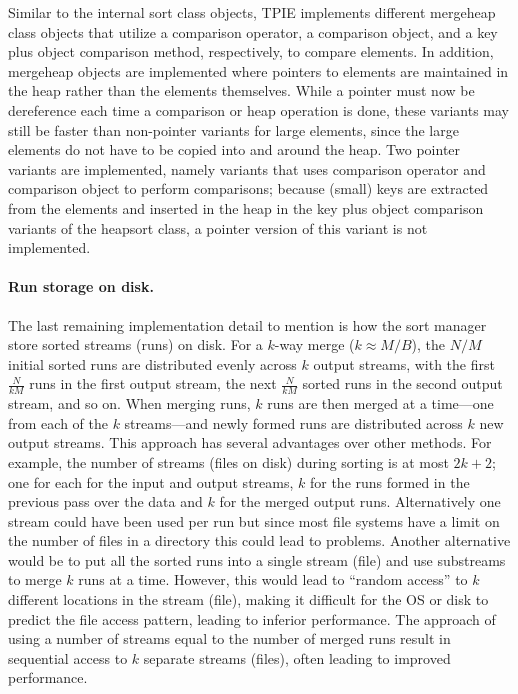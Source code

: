 Similar to the internal sort class objects, TPIE implements different
mergeheap class objects that
utilize a comparison operator, a comparison object, and a key plus
object comparison method, respectively, to compare elements. In
addition, mergeheap objects are implemented where pointers to elements are
maintained in the heap rather than the elements themselves. While a
pointer must now be dereference each time a comparison or heap
operation is done, these variants may still be faster than non-pointer
variants for large elements, since the large elements do not have to
be copied into and around the heap.
Two pointer variants are implemented, namely variants that uses
comparison operator and comparison object to perform comparisons;
because (small) keys are extracted from the elements and inserted in
the heap in the key plus object comparison variants of the heapsort
class, a pointer version of this variant is not implemented.

\paragraph{Run storage on disk.} The last remaining implementation detail
to mention is how the sort manager store sorted streams (runs) on
disk.  For a $k$-way merge ($k\approx M/B$), the $N/M$ initial sorted
runs are distributed evenly across $k$ output streams, with the first
$\frac{N}{kM}$ runs in the first output stream, the next
$\frac{N}{kM}$ sorted runs in the second output stream, and so on.
When merging runs, $k$ runs are then merged at a time---one from each
of the $k$ streams---and newly formed runs are distributed across $k$
new output streams. This approach
has several advantages over other methods. For example, the number of
streams (files on disk) during sorting is at most $2k+2$; one for each
for the input and output streams, $k$ for the runs formed in the
previous pass over the data and $k$ for the merged output runs.
Alternatively one stream could have been used per run but since most
file systems have a limit on the number of files in a directory this
could lead to problems. Another alternative would be to put all the
sorted runs into a single stream (file) and use substreams to merge
$k$ runs at a time.  However, this would lead to ``random access'' to
$k$ different locations in the stream (file), making it difficult for
the OS or disk to predict the file access pattern, leading to inferior
performance.  The approach of using a number of streams equal to the
number of merged runs result in sequential access to $k$ separate
streams (files), often leading to improved performance.

